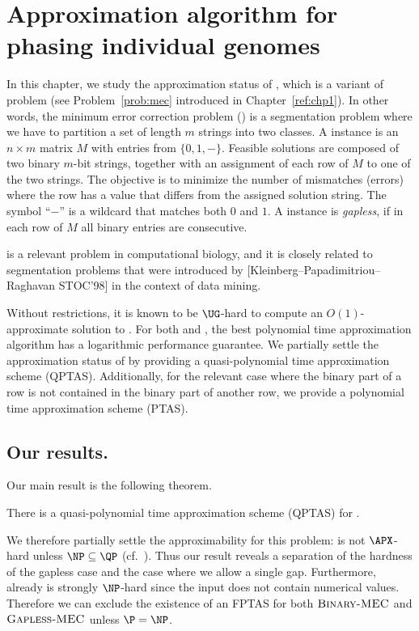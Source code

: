 \chapter{Approximation algorithm for phasing individual genomes}

In this chapter, we study the approximation status of \GMEC, which is a variant of \MEC problem (see Problem~\ref{prob:mec} introduced in Chapter~\ref{ref:chp1}).
In other words, the minimum error correction problem (\MEC) is a segmentation problem where we have to partition a set of length $m$ strings into two classes.
A \MEC instance is an $n \times m$ matrix $M$ with entries from $\{0,1,-\}$. 
    Feasible solutions are composed of two binary $m$-bit strings, together with an assignment of each row of $M$ to one of the two strings.
    The objective is to minimize the number of mismatches (errors) where the row has a value that differs from the assigned solution string.
    The symbol ``$-$'' is a wildcard that matches both $0$ and $1$.
    A \MEC instance is \textit{gapless}, if in each row of $M$ all binary entries are consecutive.

 \GMEC is a relevant problem in computational biology, and it is closely related to segmentation problems that were introduced by {[}Kleinberg--Papadimitriou--Raghavan STOC'98{]} in the context of data mining.
 
     Without restrictions, it is known to be $\UG$-hard \citep{trevisan2012khot} to compute an $O(1)$-approximate solution to \MEC. For both \MEC and \GMEC, the best polynomial time approximation algorithm has a logarithmic performance guarantee.
    We partially settle the approximation status of \GMEC by providing a quasi-polynomial time approximation scheme (QPTAS).
    Additionally, for the relevant case where the binary part of a row is not contained in the binary part of another row, we provide a polynomial time approximation scheme (PTAS).

\section{Our results.}
Our main result is the following theorem.
\begin{theorem}\label{thm:qptas}
    There is a quasi-polynomial time approximation scheme (QPTAS) for \GMEC.
\end{theorem}
We therefore partially settle the approximability for this problem: \GMEC is not $\APX$-hard unless $\NP \subseteq \QP$ (cf.~\cite{RS09_approximation}).
Thus our result reveals a separation of the hardness of the gapless case and the case where we allow a single gap.
Furthermore, already \BMEC is strongly $\NP$-hard since the input does not contain numerical values. 
Therefore we can exclude the existence of an FPTAS for both $\textsc{Binary-MEC}$ and $\textsc{Gapless-MEC}$ unless $\P = \NP$.

